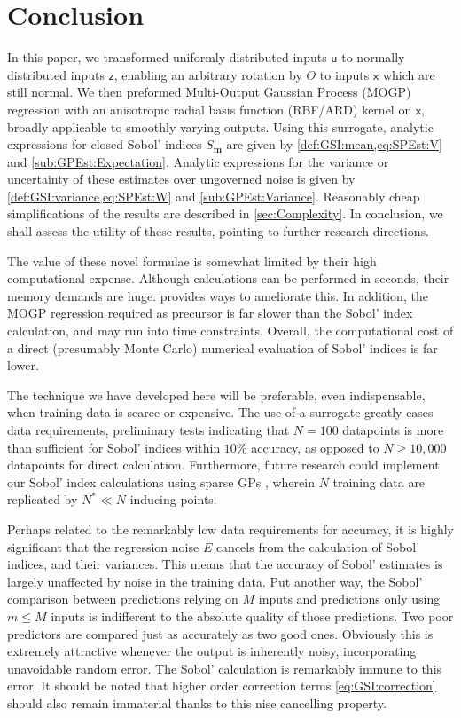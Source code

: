\documentclass[preprint,12pt]{elsarticle}
\newcommand*{\mi}[1]{\mathbf{#1}}
\newcommand*{\rv}[1]{\mathsf{#1}}
\begin{document}
\section{Conclusion}\label{sec:Conc}
    In this paper, we transformed uniformly distributed inputs $\rv{u}$ to normally distributed inputs $\rv{z}$, enabling an arbitrary rotation by $\Theta$ to inputs $\rv{x}$ which are still normal. We then preformed Multi-Output Gaussian Process (MOGP) regression with an anisotropic radial basis function (RBF/ARD) kernel on $\rv{x}$, broadly applicable to smoothly varying outputs. Using this surrogate, analytic expressions for closed Sobol' indices $S_{\mi{m}}$ are given by \cref{def:GSI:mean,eq:SPEst:V} and \cref{sub:GPEst:Expectation}. Analytic expressions for the variance or uncertainty of these estimates over ungoverned noise is given by \cref{def:GSI:variance,eq:SPEst:W} and \cref{sub:GPEst:Variance}. Reasonably cheap simplifications of the results are described in \cref{sec:Complexity}.
    In conclusion, we shall assess the utility of these results, pointing to further research directions.

    The value of these novel formulae is somewhat limited by their high computational expense. Although calculations can be performed in seconds, their memory demands are huge.  provides ways to ameliorate this. In addition, the MOGP regression required as precursor is far slower than the Sobol' index calculation, and may run into time constraints. Overall, the computational cost of a direct (presumably Monte Carlo) numerical evaluation of Sobol' indices is far lower.

    The technique we have developed here will be preferable, even indispensable, when training data is scarce or expensive. The use of a surrogate greatly eases data requirements, preliminary tests indicating that $N=100$ datapoints is more than sufficient for Sobol' indices within $10\%$ accuracy, as opposed to $N\geq 10,000$ datapoints for direct calculation. Furthermore, future research could implement our Sobol' index calculations using sparse GPs \cite{Snelson.Ghahramani2006,titsias2009,Hensman2013}, wherein $N$ training data are replicated by $N^{*} \ll N$ inducing points.

    Perhaps related to the remarkably low data requirements for accuracy, it is highly significant that the regression noise $E$ cancels from the calculation of Sobol' indices, and their variances. This means that the accuracy of Sobol' estimates is largely unaffected by noise in the training data. Put another way, the Sobol' comparison between predictions relying on $M$ inputs and predictions only using $m \leq M$ inputs is indifferent to the absolute quality of those predictions. Two poor predictors are compared just as accurately as two good ones. Obviously this is extremely attractive whenever the output is inherently noisy, incorporating unavoidable random error. The Sobol' calculation is remarkably immune to this error. It should be noted that higher order correction terms \cref{eq:GSI:correction} should also remain immaterial thanks to this nise cancelling property.
\end{document}
